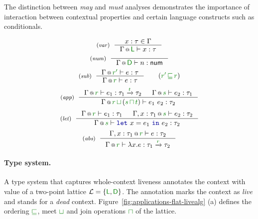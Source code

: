The distinction between \emph{may} and \emph{must} analyses demonstrates the importance of
interaction between contextual properties and certain language constructs such as conditionals.


\begin{figure}[t]
\begin{equation*}
\tyrule{var}
  {x : \tau \in \Gamma}
  {\coctx{\Gamma}{\cclrd{\cclrd{\ident{L}} }} \vdash x : \tau }
\end{equation*}
\begin{equation*}
\tyrule{num}
  {~}
  {\coctx{\Gamma}{ \cclrd{\cclrd{\ident{D}}} } \vdash n : \ident{num} }
\end{equation*}
\begin{equation*}
\tyrule{sub}
  {\coctx{\Gamma}{\cclrd{r'}} \vdash e : \tau }
  {\coctx{\Gamma}{\cclrd{r}} \vdash e : \tau }\quad\quad(\cclrd{r'} \,\cclrd{\sqsubseteq}\, \cclrd{r})
\end{equation*}
\begin{equation*}
\tyrule{app}
  {\coctx{\Gamma}{\cclrd{r}} \vdash e_1 : \tau_1 \xrightarrow{\cclrd{t}} \tau_2 &
   \coctx{\Gamma}{\cclrd{s}} \vdash e_2 : \tau_1 }
  {\coctx{\Gamma}{\cclrd{r} \,\cclrd{\sqcup}\, (\cclrd{s} \,\cclrd{\sqcap}\, \cclrd{t})} \vdash e_1~e_2 : \tau_2}
\end{equation*}
\begin{equation*}
\tyrule{let}
  { \coctx{\Gamma}{\cclrd{r}} \vdash e_1 : \tau_1 &
    \coctx{\Gamma, x:\tau_1}{\cclrd{s}} \vdash e_2 : \tau_2}
  {\coctx{\Gamma}{\cclrd{s}} \vdash \kvd{let}~x=e_1~\kvd{in}~e_2 : \tau_2 }
\end{equation*}
\begin{equation*}
\tyrule{abs}
  {\coctx{\Gamma, x:\tau_1}{\cclrd{r}} \vdash e : \tau_2}
  {\coctx{\Gamma}{\cclrd{r}} \vdash \lambda x.e : \tau_1 \xrightarrow{\cclrd{r}} \tau_2 }
\end{equation*}
\vspace{-0.9em}

\label{fig:applications-flat-liveness}
\vspace{-1.2em}
\end{figure}


\paragraph{Type system.}
A type system that captures whole-context liveness annotates the context with value of a
two-point lattice $\mathcal{L} = \{ \cclrd{\ident{L}}, \cclrd{\ident{D}} \}$. The annotation  marks
the context as \emph{live} and  stands for a \emph{dead} context.
Figure~\ref{fig:applications-flat-livealg} (a) defines the ordering $\cclrd{\sqsubseteq}$, meet $\cclrd{\sqcup}$ and join
operations $\cclrd{\sqcap}$ of the lattice.

